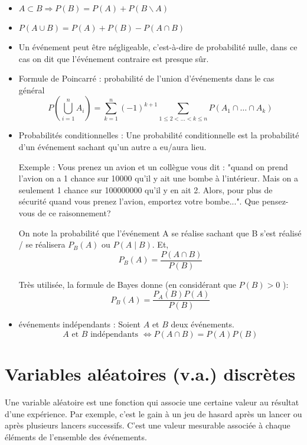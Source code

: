 \begin{itemize}
    \item \(A \subset B \Rightarrow P(B)=P(A)+P(B \backslash A)\)
    \item \(P(A \cup B)=P(A)+P(B)-P(A \cap B)\)
    \item Un événement peut être négligeable, c'est-à-dire de probabilité nulle, dans ce cas on dit que l'événement contraire est presque sûr.
    \item Formule de Poincarré : probabilité de l'union d'événements dans le cas général
    \[
    P\left(\bigcup_{i=1}^{n} A_{i}\right)=\sum_{k=1}^{n}(-1)^{k+1} \sum_{1 \leq 2<\ldots<k \leq n} P\left(A_{1} \cap \ldots \cap A_{k}\right)
    \]
    \item Probabilités conditionnelles : Une probabilité conditionnelle est la probabilité d'un événement sachant qu'un autre a eu/aura lieu.
    
    Exemple : Vous prenez un avion et un collègue vous dit : "quand on prend l'avion on a 1 chance sur 10000 qu'il y ait une bombe à l'intérieur. Mais on a seulement 1 chance sur 100000000 qu'il y en ait 2. Alors, pour plus de sécurité quand vous prenez l'avion, emportez votre bombe...". Que pensez-vous de ce raisonnement?
    
    On note la probabilité que l'événement A se réalise sachant que B s'est réalisé / se réalisera \(P_{B}(A)\) ou \(P(A \mid B)\). Et,
    \[
    P_{B}(A)=\frac{P(A \cap B)}{P(B)}
    \]
    
    Très utilisée, la formule de Bayes donne (en considérant que \(P(B)>0\) ):
    \[
    P_{B}(A)=\frac{P_{A}(B) P(A)}{P(B)}
    \]
    \item événements indépendants : Soient \(A\) et \(B\) deux événements.
    \[
    A \text { et } B \text { indépendants } \Leftrightarrow P(A \cap B)=P(A) P(B)
    \]
\end{itemize}

\section{Variables aléatoires (v.a.) discrètes}

Une variable aléatoire est une fonction qui associe une certaine valeur au résultat d'une expérience. Par exemple, c'est le gain à un jeu de hasard après un lancer ou après plusieurs lancers successifs. C'est une valeur mesurable associée à chaque éléments de l'ensemble des événements.\\

